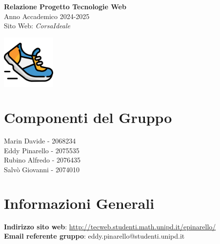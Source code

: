 \documentclass[a4paper, 12pt]{article}
\begin{document}
\begin{titlepage}
\begin{center}
    \vspace*{0.5cm}
    \Huge \textbf{Relazione Progetto Tecnologie Web} \\
    \vspace{0.5cm}
    \Large Anno Accademico 2024-2025\\
    \vspace{1cm}
    \Huge Sito Web: \textit{CorsaIdeale} \\
    \vspace{0.5cm} 

    \includegraphics[width=0.2\textwidth]{logo.png}
\end{center}

\section*{\centering Componenti del Gruppo}
\begin{center}
Marin Davide - 2068234\\
\vspace{0.2cm}
Eddy Pinarello - 2075535\\
\vspace{0.2cm}
Rubino Alfredo - 2076435\\
\vspace{0.2cm}
Salvò Giovanni - 2074010
\end{center}

\section*{\centering Informazioni Generali}
\begin{center}
\textbf{Indirizzo sito web}: \url{http://tecweb.studenti.math.unipd.it/epinarello/}\\
\vspace{0.2cm}
\textbf{Email referente gruppo}: eddy.pinarello@studenti.unipd.it
\end{center}

\renewcommand{\arraystretch}{1.5} %


\end{titlepage}
\end{document}
